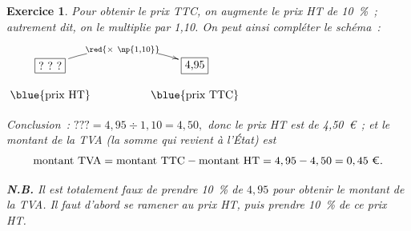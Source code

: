 \documentclass[10pt]{article}
\newtheorem{exo}{Exercice}
\begin{document}
\begin{exo}

Pour obtenir le prix TTC, on augmente le prix HT de 10~\%~; autrement dit, on le multiplie par 1,10. On peut ainsi compléter le schéma~:

\begin{center}
$\xymatrix@R=0.5pc@C=4pc{
    *+[F]+\txt{?~?~?} \ar@/^0.5cm/[r]|{\red{\times ~\np{1,10}}} & 
    *+[F]+\txt{4,95}  \\
    \txt{\blue{prix HT}}&
    \txt{\blue{prix TTC}}}$
    
    \end{center}
    
    \medskip
    
 Conclusion~: $???=4,95\div 1,10=4,50,$ donc le prix HT est de 4,50~\euro ~; et le montant de la TVA (la somme qui revient à l’État) est
 \[\text{montant TVA}=\text{montant TTC}-\text{montant HT}=4,95-4,50=0,45~\text{\euro}.\]


\medskip

\textbf{N.B.} Il est totalement faux de prendre 10~\% de $4,95$ pour obtenir le montant de la TVA. Il faut d'abord se ramener au prix HT, puis prendre 10~\% de ce prix HT.


\end{exo}
\end{document}
